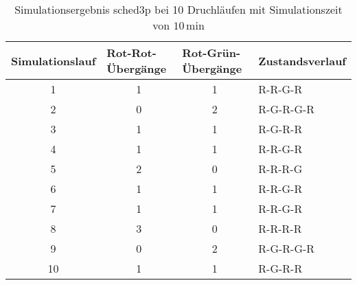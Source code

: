\documentclass[11pt, a4paper]{article}
\begin{document}
\begin{table}[H]
  \centering
\begin{tabular}{|c|c|c|l|}
\hline
\multicolumn{1}{|l|}{Simulationslauf} & \multicolumn{1}{l|}{Rot-Rot-Übergänge} & \multicolumn{1}{l|}{Rot-Grün-Übergänge} & Zustandsverlauf \\ \hline
1                                     & 1                                      & 1                                       & R-R-G-R         \\ \hline
2                                     & 0                                      & 2                                       & R-G-R-G-R       \\ \hline
3                                     & 1                                      & 1                                       & R-G-R-R         \\ \hline
4                                     & 1                                      & 1                                       & R-R-G-R         \\ \hline
5                                     & 2                                      & 0                                       & R-R-R-G         \\ \hline
6                                     & 1                                      & 1                                       & R-R-G-R         \\ \hline
7                                     & 1                                      & 1                                       & R-R-G-R         \\ \hline
8                                     & 3                                      & 0                                       & R-R-R-R         \\ \hline
9                                     & 0                                      & 2                                       & R-G-R-G-R       \\ \hline
10                                    & 1                                      & 1                                       & R-G-R-R         \\ \hline
\end{tabular}
\caption{Simulationsergebnis sched3p bei 10 Druchläufen mit Simulationszeit von $10\,\si{\minute}$}
\end{table}
\end{document}
